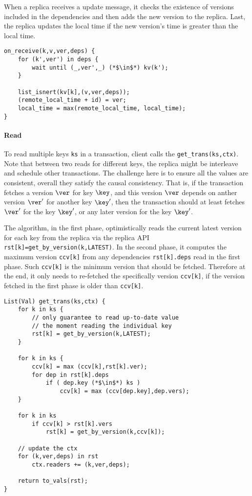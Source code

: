 When a replica receives a update message, it checks the existence of versions included in the dependencies and then adds the new version to the replica.
Last, the replica updates the local time if the new version's time is greater than the local time.


\begin{lstlisting}[caption={Receive update message},label={lst:cops-replica-receive-msg}]
on_receive(k,v,ver,deps) {
    for (k',ver') in deps {
        wait until (_,ver',_) (*$\in$*) kv(k');
    }

    list_isnert(kv[k],(v,ver,deps));
    (remote_local_time + id) = ver;
    local_time = max(remote_local_time, local_time);
}
\end{lstlisting}


\paragraph{\bf Read}
To read multiple keys \verb|ks| in a transaction, client calls the \verb|get_trans(ks,ctx)|.
Note that between two reads for different keys, 
the replica might be interleave and schedule other transactions.
The challenge here is to ensure all the values are consistent, \ie
overall they satisfy the causal consistency.
That is, if the transaction fetches a version \( \ver \) for key \( \key \),
and this version \( \ver \) depends on anther version \( \ver' \) for another key \( \key' \), 
then the transaction should at least fetches \( \ver' \) for the key \( \key' \),
or any later version  for the key \( \key' \).

The algorithm, in the first phase, optimistically reads the current latest version for each key from the replica via the replica API \verb|rst[k]=get_by_version(k,LATEST)|.
In the second phase, it computes the maximum version \verb|ccv[k]| from any dependencies \verb|rst[k].deps| read in the first phase.
Such \verb|ccv[k]| is the minimum version that should be fetched.
Therefore at the end, it only needs to re-fetched the specifically version \verb|ccv[k]|,
if the version fetched in the first phase is older than \verb|ccv[k]|.

\begin{lstlisting}[caption={Reads},label={lst:cops-client-read}]
List(Val) get_trans(ks,ctx) {
    for k in ks {
        // only guarantee to read up-to-date value 
        // the moment reading the individual key
        rst[k] = get_by_version(k,LATEST);
    }

    for k in ks {
        ccv[k] = max (ccv[k],rst[k].ver);
        for dep in rst[k].deps
            if ( dep.key (*$\in$*) ks )
                ccv[k] = max (ccv[dep.key],dep.vers);
    }

    for k in ks 
        if ccv[k] > rst[k].vers
            rst[k] = get_by_version(k,ccv[k]);

    // update the ctx
    for (k,ver,deps) in rst
        ctx.readers += (k,ver,deps);

    return to_vals(rst);
}                                   
\end{lstlisting}


